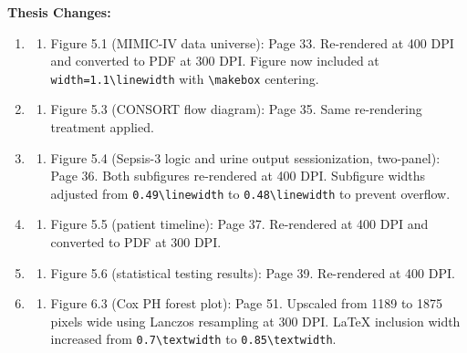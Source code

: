 \documentclass[12pt,a4paper]{article}
\begin{document}
\begin{flushleft}
\textbf{Thesis Changes:}
\begin{enumerate}
    \item
    \begin{enumerate}
        \item Figure 5.1 (MIMIC-IV data universe): Page 33. Re-rendered at 400 DPI and converted to PDF at 300 DPI. Figure now included at \texttt{width=1.1\textbackslash linewidth} with \texttt{\textbackslash makebox} centering.
    \end{enumerate}
    \item
    \begin{enumerate}
        \item Figure 5.3 (CONSORT flow diagram): Page 35. Same re-rendering treatment applied.
    \end{enumerate}
    \item
    \begin{enumerate}
        \item Figure 5.4 (Sepsis-3 logic and urine output sessionization, two-panel): Page 36. Both subfigures re-rendered at 400 DPI. Subfigure widths adjusted from \texttt{0.49\textbackslash linewidth} to \texttt{0.48\textbackslash linewidth} to prevent overflow.
    \end{enumerate}
    \item
    \begin{enumerate}
        \item Figure 5.5 (patient timeline): Page 37. Re-rendered at 400 DPI and converted to PDF at 300 DPI.
    \end{enumerate}
    \item
    \begin{enumerate}
        \item Figure 5.6 (statistical testing results): Page 39. Re-rendered at 400 DPI.
    \end{enumerate}
    \item
    \begin{enumerate}
        \item Figure 6.3 (Cox PH forest plot): Page 51. Upscaled from 1189 to 1875 pixels wide using Lanczos resampling at 300 DPI. LaTeX inclusion width increased from \texttt{0.7\textbackslash textwidth} to \texttt{0.85\textbackslash textwidth}.
    \end{enumerate}
\end{enumerate}

\vspace{\baselineskip}



\end{flushleft}
\end{document}
